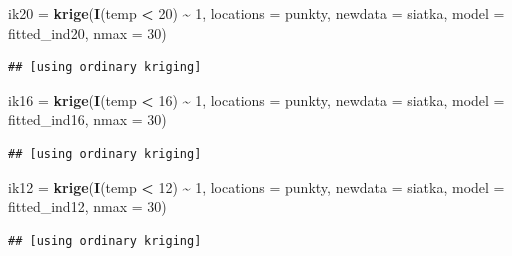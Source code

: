 \documentclass[
  paper=6in:9in,pagesize=pdftex,headinclude=on,footinclude=on,10pt]{scrbook}
\newenvironment{Shaded}{\begin{snugshade}}{\end{snugshade}}
\newcommand{\AttributeTok}[1]{\textcolor[rgb]{0.13,0.29,0.53}{#1}}
\newcommand{\DecValTok}[1]{\textcolor[rgb]{0.00,0.00,0.81}{#1}}
\newcommand{\FunctionTok}[1]{\textcolor[rgb]{0.13,0.29,0.53}{\textbf{#1}}}
\newcommand{\NormalTok}[1]{#1}
\newcommand{\OtherTok}[1]{\textcolor[rgb]{0.56,0.35,0.01}{#1}}
\newcommand{\SpecialCharTok}[1]{\textcolor[rgb]{0.81,0.36,0.00}{\textbf{#1}}}
\begin{document}
\begin{Shaded}
\begin{Highlighting}[]
\NormalTok{ik20 }\OtherTok{=} \FunctionTok{krige}\NormalTok{(}\FunctionTok{I}\NormalTok{(temp }\SpecialCharTok{\textless{}} \DecValTok{20}\NormalTok{) }\SpecialCharTok{\textasciitilde{}} \DecValTok{1}\NormalTok{,}
              \AttributeTok{locations =}\NormalTok{ punkty,}
              \AttributeTok{newdata =}\NormalTok{ siatka,}
              \AttributeTok{model =}\NormalTok{ fitted\_ind20, }
              \AttributeTok{nmax =} \DecValTok{30}\NormalTok{)}
\end{Highlighting}
\end{Shaded}

\begin{verbatim}
## [using ordinary kriging]
\end{verbatim}

\begin{Shaded}
\begin{Highlighting}[]
\NormalTok{ik16 }\OtherTok{=} \FunctionTok{krige}\NormalTok{(}\FunctionTok{I}\NormalTok{(temp }\SpecialCharTok{\textless{}} \DecValTok{16}\NormalTok{) }\SpecialCharTok{\textasciitilde{}} \DecValTok{1}\NormalTok{,}
              \AttributeTok{locations =}\NormalTok{ punkty,}
              \AttributeTok{newdata =}\NormalTok{ siatka,}
              \AttributeTok{model =}\NormalTok{ fitted\_ind16, }
              \AttributeTok{nmax =} \DecValTok{30}\NormalTok{)}
\end{Highlighting}
\end{Shaded}

\begin{verbatim}
## [using ordinary kriging]
\end{verbatim}

\begin{Shaded}
\begin{Highlighting}[]
\NormalTok{ik12 }\OtherTok{=} \FunctionTok{krige}\NormalTok{(}\FunctionTok{I}\NormalTok{(temp }\SpecialCharTok{\textless{}} \DecValTok{12}\NormalTok{) }\SpecialCharTok{\textasciitilde{}} \DecValTok{1}\NormalTok{,}
              \AttributeTok{locations =}\NormalTok{ punkty,}
              \AttributeTok{newdata =}\NormalTok{ siatka,}
              \AttributeTok{model =}\NormalTok{ fitted\_ind12, }
              \AttributeTok{nmax =} \DecValTok{30}\NormalTok{)}
\end{Highlighting}
\end{Shaded}

\begin{verbatim}
## [using ordinary kriging]
\end{verbatim}
\end{document}
